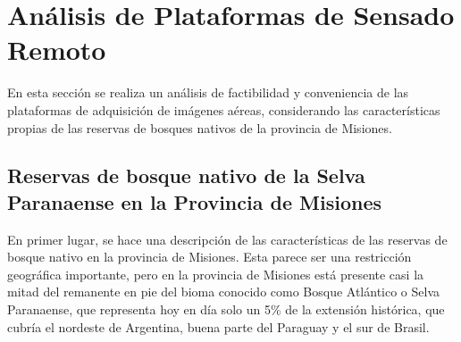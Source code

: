 \section{Análisis de Plataformas de Sensado Remoto}
En esta sección se realiza un análisis de factibilidad y conveniencia de las plataformas de adquisición de imágenes aéreas, considerando las características propias de las reservas de bosques nativos de la provincia de Misiones.\\

\subsection{Reservas de bosque nativo de la Selva Paranaense en la Provincia de Misiones}
En primer lugar, se hace una descripción de las características de las reservas de bosque nativo en la provincia de Misiones. Esta parece ser una restricción geográfica importante, pero en la provincia de Misiones está presente casi la mitad del remanente en pie del bioma conocido como Bosque Atlántico o Selva Paranaense, que representa hoy en día solo un 5\% de la extensión histórica, que cubría el nordeste de Argentina, buena parte del Paraguay y el sur de Brasil. 

